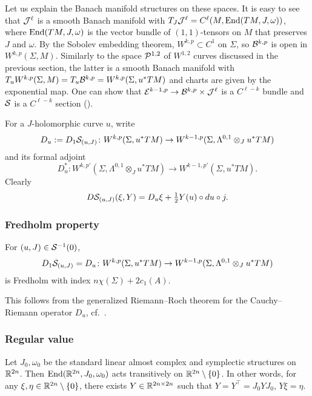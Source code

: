 \medskip

Let us explain the Banach manifold structures on these spaces. 
It is easy to see that ${\mathcal{J}}^\ell$ is a smooth Banach manifold 
with $T_J {\mathcal{J}}^\ell = C^\ell (M, \operatorname{End}(TM, J, \omega))$, where 
$\operatorname{End}(TM, J, \omega)$ is the vector bundle of $(1, 1)$-tensors on $M$ 
that preserves $J$ and $\omega$. 
By the Sobolev embedding theorem, $W^{k, p} \subset C^1$ on $\Sigma$, 
so ${\mathcal{B}}^{k, p}$ is open in $W^{k, p}(\Sigma, M)$. 
Similarly to the space ${\mathcal{P}}^{1, 2}$ of $W^{1, 2}$ curves discussed 
in the previous section, the latter is a smooth Banach manifold with 
$T_u W^{k, p} (\Sigma, M) = T_u {\mathcal{B}}^{k, p} = W^{k, p} (\Sigma, u^*TM)$ 
and charts are given by the exponential map. 
One can show that ${\mathcal{E}}^{k - 1, p} \to {\mathcal{B}}^{k, p} \times {\mathcal{J}}^\ell$ 
is a $C^{\ell - k}$ bundle and ${\mathcal{S}}$ is a $C^{\ell - k}$ section 
(\cite[p.50]{MS}).

\medskip

For a $J$-holomorphic curve $u$, write 
\[
	D_u := D_1{\mathcal{S}}_{(u, J)} \colon W^{k, p} (\Sigma, u^*TM) 
		\to W^{k - 1, p} (\Sigma, \Lambda^{0, 1} \otimes_J u^*TM)
\] 
and its formal adjoint 
\[
	D_u^* \colon W^{k, p'} (\Sigma, \Lambda^{0, 1} \otimes_J u^*TM)
		\to W^{k - 1, p'} (\Sigma, u^*TM).
\] 
Clearly 
\[
	D{\mathcal{S}}_{(u, J)} (\xi, Y) = D_u \xi + \tfrac{1}{2} Y(u) \circ du\circ j.
\]

\subsubsection{Fredholm property}

\begin{proposition}
	For $(u, J) \in {\mathcal{S}}^{-1} (0)$, 
	\[
		D_1{\mathcal{S}}_{(u, J)} = D_u \colon W^{k, p} (\Sigma, u^*TM)
			\to W^{k - 1, p} (\Sigma, \Lambda^{0, 1} \otimes_J u^*TM)
	\] 
	is Fredholm with index $n\chi(\Sigma) + 2 c_1(A)$.
\end{proposition}

This follows from the generalized Riemann--Roch theorem 
for the Cauchy--Riemann operator $D_u$, cf.\ \cite[Theorem~C.1.10]{MS}.

\subsubsection{Regular value}

\begin{lemma}
	Let $J_0, \omega_0$ be the standard linear almost complex 
	and symplectic structures on ${\mathbb{R}}^{2n}$. 
	Then $\operatorname{End}({\mathbb{R}}^{2n}, J_0, \omega_0)$ acts transitively on 
	${\mathbb{R}}^{2n} \setminus \{0\}$. 
	In other words, for any $\xi, \eta \in {\mathbb{R}}^{2n} \setminus \{0\}$, 
	there exists $Y \in {\mathbb{R}}^{2n \times 2n}$ such that 
	$Y = Y^\intercal = J_0 Y J_0$, $Y \xi = \eta$.
\end{lemma}

